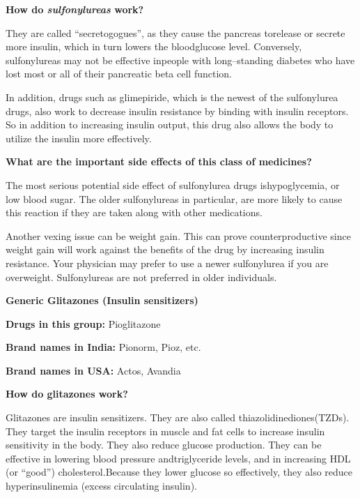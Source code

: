 \vskip 4pt

\noindent\textbf{How do \textit{sulfonylureas} work?}
\vskip 4pt

They are called “secretogogues”, as they cause the pancreas to\break release or secrete more insulin, which in turn lowers the blood\break glucose level. Conversely, sulfonylureas may not be effective in\break people with long–standing diabetes who have lost most or all of their pancreatic beta cell function.

In addition, drugs such as glimepiride, which is the newest of the sulfonylurea drugs, also work to decrease insulin resistance by binding with insulin receptors. So in addition to increasing insulin output, this drug also allows the body to utilize the insulin more effectively.

\vskip 4pt

\noindent\textbf{What are the important side effects of this class of medicines?}
\vskip 4pt

The most serious potential side effect of sulfonylurea drugs is\break hypoglycemia, or low blood sugar. The older sulfonylureas in parti\-cular, are more likely to cause this reaction if they are taken along with other medications.

Another vexing issue can be weight gain. This can prove counter\-productive since weight gain will work against the benefits of the drug by increasing insulin resistance. Your physician may prefer to use a newer sulfonylurea if you are overweight. Sulfonylureas are not pre\-ferred in older individuals.

\vskip 6pt

\textbf{Generic Glitazones (Insulin sensitizers)}
\vskip 3pt

\textbf{Drugs in this group:} Pioglitazone

\textbf{Brand names in India:} Pionorm, Pioz, etc.

\textbf{Brand names in USA:} Actos, Avandia

\vskip 5pt

\noindent\textbf{How do glitazones work?}
\vskip 3pt

Glitazones are insulin sensitizers. They are also called thiazolidinediones(TZDs). They target the insulin receptors in muscle and fat cells to increase insulin sensitivity in the body. They also reduce glucose production. They can be effective in lowering blood pressure and\break triglyceride levels, and in increasing HDL (or “good”) cholesterol.\break Because they lower glucose so effectively, they also reduce hyper\-insu\-linemia (excess circulating insulin).

